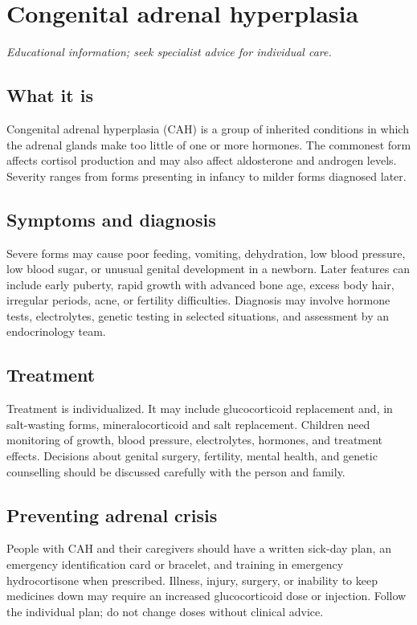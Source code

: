 \chapter{Congenital adrenal hyperplasia}

\medskip
\noindent\textit{Educational information; seek specialist advice for individual care.}

\section*{What it is}
Congenital adrenal hyperplasia (CAH) is a group of inherited conditions in which the adrenal glands make too little of one or more hormones. The commonest form affects cortisol production and may also affect aldosterone and androgen levels. Severity ranges from forms presenting in infancy to milder forms diagnosed later.

\section*{Symptoms and diagnosis}
Severe forms may cause poor feeding, vomiting, dehydration, low blood pressure, low blood sugar, or unusual genital development in a newborn. Later features can include early puberty, rapid growth with advanced bone age, excess body hair, irregular periods, acne, or fertility difficulties. Diagnosis may involve hormone tests, electrolytes, genetic testing in selected situations, and assessment by an endocrinology team.

\section*{Treatment}
Treatment is individualized. It may include glucocorticoid replacement and, in salt-wasting forms, mineralocorticoid and salt replacement. Children need monitoring of growth, blood pressure, electrolytes, hormones, and treatment effects. Decisions about genital surgery, fertility, mental health, and genetic counselling should be discussed carefully with the person and family.

\section*{Preventing adrenal crisis}
People with CAH and their caregivers should have a written sick-day plan, an emergency identification card or bracelet, and training in emergency hydrocortisone when prescribed. Illness, injury, surgery, or inability to keep medicines down may require an increased glucocorticoid dose or injection. Follow the individual plan; do not change doses without clinical advice.

